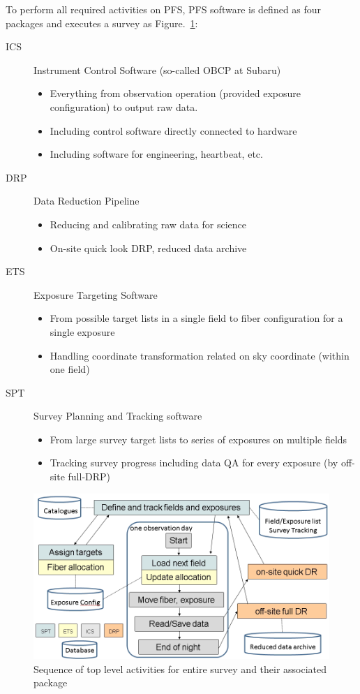 \documentclass[a4paper,notitlepage]{article}
\begin{document}
To perform all required activities on PFS, PFS software is defined as
four packages and executes a survey as
Figure.~\ref{fig:sciops-scireq-slide-softcoord}:
\begin{description}
 \item[ICS] Instrument Control Software (so-called OBCP at Subaru)
	    \begin{itemize}
	     \item Everything from observation operation (provided exposure
		   configuration) to output raw data.
	     \item Including control software directly connected to hardware
	     \item Including software for engineering, heartbeat, etc.
	    \end{itemize}
 \item[DRP] Data Reduction Pipeline
	    \begin{itemize}
	     \item Reducing and calibrating raw data for science
	     \item On-site quick look DRP, reduced data archive
	    \end{itemize}
 \item[ETS] Exposure Targeting Software
	    \begin{itemize}
	     \item From possible target lists in a single field to fiber
		   configuration for a single exposure
	     \item Handling coordinate transformation related on sky coordinate
		   (within one field)
	    \end{itemize}
 \item[SPT] Survey Planning and Tracking software
	    \begin{itemize}
	     \item From large survey target lists to series of exposures on
		   multiple fields
	     \item Tracking survey progress including data QA for every
		   exposure (by off-site full-DRP)
	    \end{itemize}
\end{description}

\begin{figure}[htb]
  \begin{center}
    \includegraphics[width=.75\linewidth]{sciops-scireq-slide-softcoord.png}
  \end{center}
  \caption{Sequence of top level activities for entire survey and 
    their associated package}
  \label{fig:sciops-scireq-slide-softcoord}
\end{figure}
\end{document}
